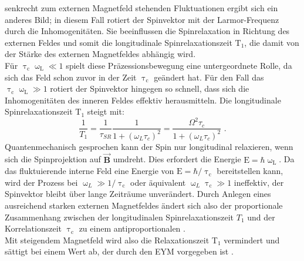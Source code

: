 senkrecht zum externen Magnetfeld stehenden Fluktuationen ergibt sich ein
anderes Bild; in diesem Fall rotiert der Spinvektor mit der Larmor-Frequenz
durch die Inhomogenitäten. Sie beeinflussen die Spinrelaxation in Richtung des
externen Feldes und somit die longitudinale Spinrelaxationszeit
$\text{T}_\text{1}$, die damit von der Stärke des externen Magnetfeldes abhängig
wird.\\ Für $\uptau_\text{c}\upomega_\text{L} \ll \text{1}$ spielt diese
Präzessionsbewegung eine untergeordnete Rolle, da sich das Feld schon zuvor in
der Zeit $\uptau_\text{c}$ geändert hat. Für den Fall das $\uptau_\text{c}
\upomega_\text{L} \gg \text{1}$ rotiert der Spinvektor hingegen so schnell, dass
sich die Inhomogenitäten des inneren Feldes effektiv herausmitteln. Die
longitudinale Spinrelaxationszeit $\text{T}_\text{1}$ steigt mit:
\begin{equation} \frac{1}{T_1}=\frac{1}{\tau_{SR}}\frac{1}{1+(\omega_L
\tau_{c})^2}=\frac{\Omega^2 \tau_c}{1+(\omega_L \tau_{c})^2} \text{ .}
\end{equation} Quantenmechanisch gesprochen kann der Spin nur longitudinal
relaxieren, wenn sich die Spinprojektion auf $\vec{\textbf{B}}$  umdreht. Dies
erfordert die Energie $\text{E}=\hbar\upomega_\text{L}$. Da das fluktuierende
interne Feld eine Energie von $\text{E}=\hbar/\uptau_\text{c}$ bereitstellen
kann, wird der Prozess bei $\upomega_{L}\gg\text{1}/\uptau_\text{c}$ oder
äquivalent $\upomega_{L}\uptau_\text{c}\gg\text{1}$ ineffektiv, der Spinvektor
bleibt über lange Zeiträume unverändert. Durch Anlegen eines ausreichend starken
externen Magnetfeldes ändert sich also der proportionale Zusammenhang zwischen
der longitudinalen Spinrelaxationszeit $T_\text{1}$ und der Korrelationszeit
$\uptau_\text{c}$ zu einem antiproportionalen \cite{Dyakonov.2008}.\\ Mit
steigendem Magnetfeld wird also die Relaxationszeit T$_\text{1}$ vermindert und
sättigt bei einem Wert ab, der durch den EYM vorgegeben ist \cite{Bronold.2002}.
